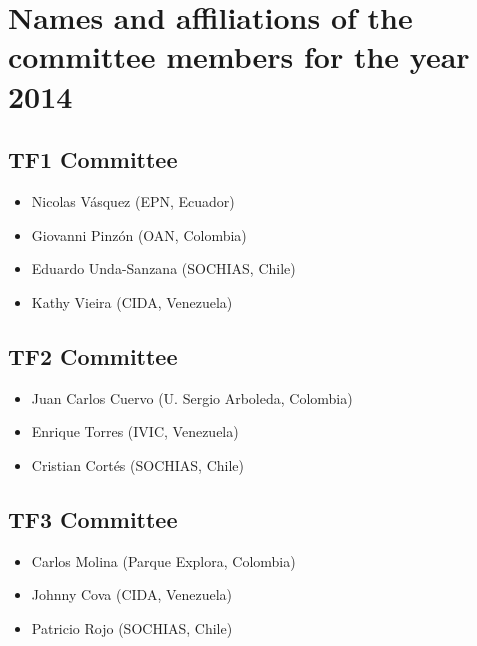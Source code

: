 \documentclass[12pt]{article}
\begin{document}
\section{Names and affiliations of the committee members for the year 2014}

\subsection*{TF1 Committee}
\begin{itemize}
\item Nicolas V\'asquez (EPN, Ecuador)
\item Giovanni Pinz\'on (OAN, Colombia)
\item Eduardo Unda-Sanzana (SOCHIAS, Chile)
\item Kathy Vieira (CIDA, Venezuela)
\end{itemize}

\subsection*{TF2 Committee}
\begin{itemize}
\item Juan Carlos Cuervo (U. Sergio Arboleda, Colombia)
\item Enrique Torres  (IVIC, Venezuela)
\item Cristian Cort\'es (SOCHIAS, Chile)
\end{itemize}

\subsection*{TF3 Committee}
\begin{itemize}
\item Carlos Molina (Parque Explora, Colombia)
\item Johnny Cova (CIDA, Venezuela)
\item Patricio Rojo (SOCHIAS, Chile)
\end{itemize}
\end{document}
